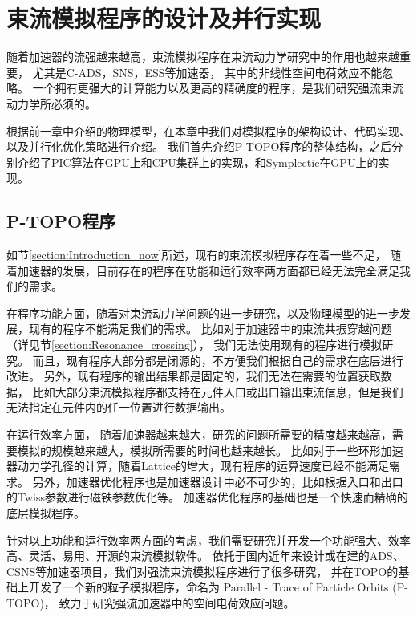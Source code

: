 
\chapter{束流模拟程序的设计及并行实现}
\label{chap:Code}
随着加速器的流强越来越高，束流模拟程序在束流动力学研究中的作用也越来越重要，
尤其是C-ADS，SNS，ESS等加速器\cite{li2013ADS,henderson2014SNS,eshraqi2016ess}，
其中的非线性空间电荷效应不能忽略。
一个拥有更强大的计算能力以及更高的精确度的程序，是我们研究强流束流动力学所必须的。

根据前一章中介绍的物理模型，在本章中我们对模拟程序的架构设计、代码实现、以及并行化优化策略进行介绍。
我们首先介绍P-TOPO程序的整体结构，之后分别介绍了PIC算法在GPU上和CPU集群上的实现，和Symplectic在GPU上的实现。

\section{P-TOPO程序}

如节\eqref{section:Introduction_now}所述，现有的束流模拟程序存在着一些不足，
随着加速器的发展，目前存在的程序在功能和运行效率两方面都已经无法完全满足我们的需求。

在程序功能方面，随着对束流动力学问题的进一步研究，以及物理模型的进一步发展，现有的程序不能满足我们的需求。
比如对于加速器中的束流共振穿越问题（详见节\ref{section:Resonance_crossing}），
我们无法使用现有的程序进行模拟研究。
而且，现有程序大部分都是闭源的，不方便我们根据自己的需求在底层进行改进。
另外，现有程序的输出结果都是固定的，我们无法在需要的位置获取数据，
比如大部分束流模拟程序都支持在元件入口或出口输出束流信息，但是我们无法指定在元件内的任一位置进行数据输出。

在运行效率方面，
随着加速器越来越大，研究的问题所需要的精度越来越高，需要模拟的规模越来越大，模拟所需要的时间也越来越长。
比如对于一些环形加速器动力学孔径的计算，随着Lattice的增大，现有程序的运算速度已经不能满足需求。
另外，加速器优化程序也是加速器设计中必不可少的，比如根据入口和出口的Twiss参数进行磁铁参数优化等。
加速器优化程序的基础也是一个快速而精确的底层模拟程序。

针对以上功能和运行效率两方面的考虑，我们需要研究并开发一个功能强大、效率高、灵活、易用、开源的束流模拟软件。
依托于国内近年来设计或在建的ADS、CSNS等加速器项目，我们对强流束流模拟程序进行了很多研究，
并在TOPO\cite{chao2014TOPOPIC}的基础上开发了一个新的粒子模拟程序，命名为 Parallel - Trace of Particle Orbits (P-TOPO)，
致力于研究强流加速器中的空间电荷效应问题\cite{li2016nonlinear,li2014envelope,li16collective,li2015space}。

